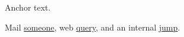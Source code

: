 \documentclass{article}
\begin{document}
\hypertarget{here}{Anchor text.}
Mail \href{mailto:someone@example.com}{someone}, web \href{https://example.com/x?y=1}{query},
and an internal \href{#here}{jump}.
\end{document}
